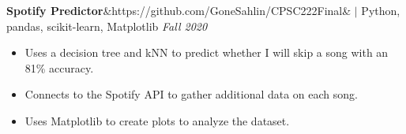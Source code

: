 \documentclass[11pt, a4paper, roman]{moderncv}
\newcommand{\project}[5]{
	\textbf{#1}\ifx&#2&{}
	\else
    		\href{#2}{\:\small\faGithub\:}\fi$|$ #3
	\hfill\textit{#4}
	#5
	\vspace{2mm}
}
\begin{document}
{\project{Spotify Predictor}{https://github.com/GoneSahlin/CPSC222Final}{Python, pandas, scikit-learn, Matplotlib}{Fall 2020}
	{\begin{itemize}
    		\item Uses a decision tree and kNN to predict whether I will skip a song with an 81\% accuracy.
    		\item Connects to the Spotify API to gather additional data on each song.
   		 \item Uses Matplotlib to create plots to analyze the dataset.
	\end{itemize}}
}
\end{document}
